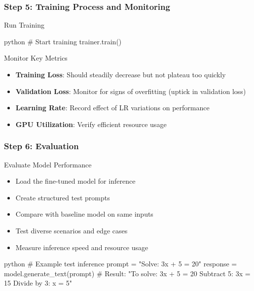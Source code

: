 \documentclass[aspectratio=169]{beamer}
\begin{document}
\begin{frame}[fragile]
	\frametitle{Step 5: Training Process and Monitoring}
	\begin{block}{Run Training}
		\begin{mintedbox}{python}
# Start training
trainer.train()
		\end{mintedbox}
	\end{block}
	\begin{block}{Monitor Key Metrics}
		\begin{itemize}
			\item \textbf{Training Loss}: Should steadily decrease but not plateau too quickly
			\item \textbf{Validation Loss}: Monitor for signs of overfitting (uptick in validation loss)
			\item \textbf{Learning Rate}: Record effect of LR variations on performance
			\item \textbf{GPU Utilization}: Verify efficient resource usage
		\end{itemize}
	\end{block}
\end{frame}

\begin{frame}[fragile]
	\frametitle{Step 6: Evaluation}
	\begin{block}{Evaluate Model Performance}
		\begin{itemize}
			\item Load the fine-tuned model for inference
			\item Create structured test prompts
			\item Compare with baseline model on same inputs
			\item Test diverse scenarios and edge cases
			\item Measure inference speed and resource usage
		\end{itemize}
	\end{block}
	\begin{mintedbox}{python}
# Example test inference
prompt = "Solve: 3x + 5 = 20"
response = model.generate_text(prompt)
# Result: "To solve: 3x + 5 = 20
Subtract 5: 3x = 15
Divide by 3: x = 5"
	\end{mintedbox}
\end{frame}
\end{document}
